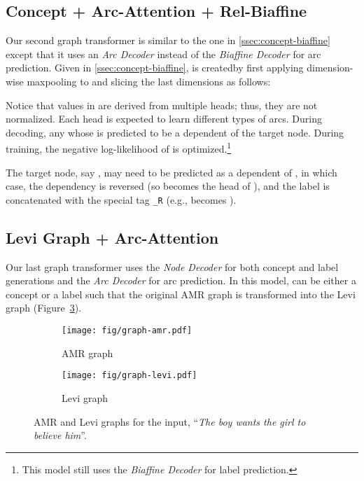 \documentclass[11pt,a4paper]{article}
\newcommand{\LN}{\linebreak\noindent}    \newcommand{\textsec}[1]{\textsection\ref{#1}}
\begin{document}
\subsection{Concept + Arc-Attention + Rel-Biaffine}
\label{ssec:concept-biaffine-attention}

Our second graph transformer is similar to the one in \textsec{ssec:concept-biaffine} except that it uses an \textit{Arc Decoder} instead of the \textit{Biaffine Decoder} for arc prediction.
Given  in \textsec{ssec:concept-biaffine},  is created\LN by first applying dimension-wise maxpooling to  and slicing the last  dimensions as follows:

Notice that values in  are derived from multiple heads; thus, they are not normalized.
Each head is expected to learn different types of arcs.
During decoding, any  whose  is predicted to be a dependent of the target node.
During training, the negative log-likelihood of  is optimized.\footnote{This model still uses the \textit{Biaffine Decoder} for label prediction.}

The target node, say , may need to be predicted as a dependent of , in which case, the dependency is reversed (so  becomes the head of ), and the label is concatenated with the special tag \texttt{\_R} (e.g.,  becomes ).




\subsection{Levi Graph + Arc-Attention}
\label{ssec:concept-label-attention}

Our last graph transformer uses the \textit{Node Decoder} for both concept and label generations and the \textit{Arc Decoder} for arc prediction.
In this model,  can be either a concept or a label such that the original AMR graph is transformed into the Levi graph\LN \cite{levi1942finite, beck-etal-2018-graph} (Figure~\ref{fig:graph-amr-levi}).

\begin{figure}[htbp!]
 \centering
 \begin{subfigure}[b]{0.44\columnwidth}
     \centering
     \texttt{[image: fig/graph-amr.pdf]}
     \caption{AMR graph}
     \label{fig:graph-amr}
 \end{subfigure}
 \hfill
 \begin{subfigure}[b]{0.50\columnwidth}
     \centering
     \texttt{[image: fig/graph-levi.pdf]}
     \caption{Levi graph}
     \label{fig:graph-levi}
 \end{subfigure}
\caption{AMR and Levi graphs for the input, ``\textit{The boy wants the girl to believe him}''.}
\label{fig:graph-amr-levi}
\end{figure}
\end{document}
